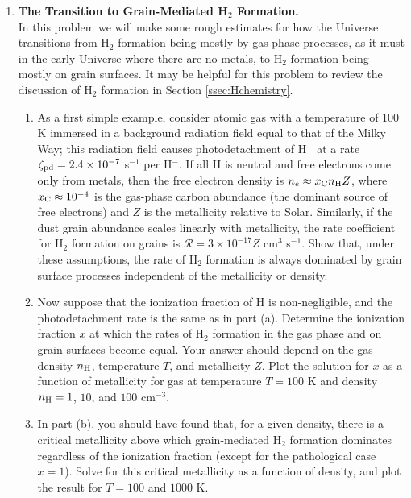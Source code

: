 \begin{enumerate}
\item \textbf{The Transition to Grain-Mediated H$_2$ Formation.}\\
In this problem we will make some rough estimates for how the Universe transitions from H$_2$ formation being mostly by gas-phase processes, as it must in the early Universe where there are no metals, to H$_2$ formation being mostly on grain surfaces. It may be helpful for this problem to review the discussion of H$_2$ formation in Section \ref{ssec:Hchemistry}.
\begin{enumerate}
\item As a first simple example, consider atomic gas with a temperature of $100$ K immersed in a background radiation field equal to that of the Milky Way; this radiation field causes photodetachment of H$^-$ at a rate $\zeta_{\rm pd} = 2.4\times 10^{-7}$ s$^{-1}$ per H$^-$. If all H is neutral and free electrons come only from metals, then the free electron density is $n_e \approx x_{\rm C} n_{\rm H} Z$, where $x_{\rm C} \approx 10^{-4}$ is the gas-phase carbon abundance (the dominant source of free electrons) and $Z$ is the metallicity relative to Solar. Similarly, if the dust grain abundance scales linearly with metallicity, the rate coefficient for H$_2$ formation on grains is $\mathcal{R} = 3\times 10^{-17} Z$ cm$^3$ s$^{-1}$. Show that, under these assumptions, the rate of H$_2$ formation is always dominated by grain surface processes independent of the metallicity or density.
\item Now suppose that the ionization fraction of H is non-negligible, and the photodetachment rate is the same as in part (a). Determine the ionization fraction $x$ at which the rates of H$_2$ formation in the gas phase and on grain surfaces become equal. Your answer should depend on the gas density $n_{\rm H}$, temperature $T$, and metallicity $Z$. Plot the solution for $x$ as a function of metallicity for gas at temperature $T=100$ K and density $n_{\rm H} = 1$, $10$, and $100$ cm$^{-3}$.
\item In part (b), you should have found that, for a given density, there is a critical metallicity above which grain-mediated H$_2$ formation dominates regardless of the ionization fraction (except for the pathological case $x=1$). Solve for this critical metallicity as a function of density, and plot the result for $T = 100$ and $1000$ K.
\end{enumerate}


\end{enumerate}
